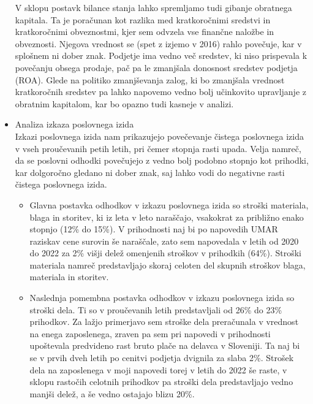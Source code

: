 \documentclass[12pt,a4paper]{amsart}
\theoremstyle{definition} %
\theoremstyle{plain} %
\begin{document}
\begin{itemize}
V sklopu postavk bilance stanja lahko spremljamo tudi gibanje obratnega kapitala. Ta je poračunan kot razlika med kratkoročnimi sredstvi in kratkoročnimi obveznostmi, kjer sem odvzela vse finančne naložbe in obveznosti. Njegova vrednost se (spet z izjemo v 2016) rahlo povečuje, kar v splošnem ni dober znak. Podjetje ima vedno več sredstev, ki niso prispevala k povečanju obsega prodaje, pač pa le zmanjšala donosnost sredstev podjetja (ROA). Glede na politiko zmanjševanja zalog, ki bo zmanjšala vrednost kratkoročnih sredstev pa lahko napovemo vedno bolj učinkovito upravljanje z obratnim kapitalom, kar bo opazno tudi kasneje v analizi.\\

\item Analiza izkaza poslovnega izida\\
Izkazi poslovnega izida nam prikazujejo povečevanje čistega poslovnega izida v vseh proučevanih petih letih, pri čemer stopnja rasti upada. Velja namreč, da se poslovni odhodki povečujejo z vedno bolj podobno stopnjo kot prihodki, kar dolgoročno gledano ni dober znak, saj lahko vodi do negativne rasti čistega poslovnega izida.
\begin{itemize}
\item Glavna postavka odhodkov v izkazu poslovnega izida so stroški materiala, blaga in storitev, ki iz leta v leto naraščajo, vsakokrat za približno enako stopnjo  (12\% do 15\%). V prihodnosti naj bi po napovedih UMAR raziskav cene surovin še naraščale, zato sem napovedala v letih od 2020 do 2022 za 2\% višji delež omenjenih stroškov v prihodkih (64\%). Stroški materiala namreč predstavljajo skoraj celoten del skupnih stroškov blaga, materiala in storitev. 
\item Naslednja pomembna postavka odhodkov v izkazu poslovnega izida so stroški dela. Ti so v proučevanih letih predstavljali od 26\% do 23\% prihodkov. Za lažjo primerjavo sem stroške dela preračunala v vrednost na enega zaposlenega, zraven pa sem pri napovedi v prihodnosti upoštevala predvideno rast bruto plače na delavca v Sloveniji. Ta naj bi se v prvih dveh letih po cenitvi podjetja dvignila za slaba 2\%. Strošek dela na zaposlenega v moji napovedi torej v letih do 2022 še raste, v sklopu rastočih celotnih prihodkov pa stroški dela predstavljajo vedno manjši delež, a še vedno ostajajo blizu 20\%.

\end{itemize}
\end{itemize}
\end{document}
